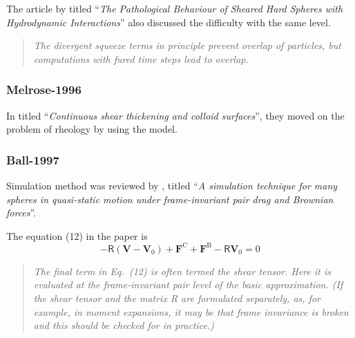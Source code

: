 \documentclass[12pt]{article}
\newcommand{\tens}[1]{\bm{\mathsf{#1}}}
\begin{document}
The article by \citet{Melrose_1995}
titled ``\emph{The Pathological Behaviour of Sheared Hard Spheres with Hydrodynamic Interactions}'' also discussed the difficulty with the same level.

\begin{quote}
\emph{The divergent squeeze terms in principle prevent overlap of particles,
 but computations with fured time steps lead to overlap. }
\end{quote}

\subsubsection*{Melrose-1996}

In \citet{Melrose_1996}
titled ``\emph{Continuous shear thickening and colloid surfaces}'',
they moved on the problem of rheology 
by using the model.  



\subsubsection*{Ball-1997}

Simulation method was reviewed  
by \citet{Ball_1997},
titled 
``\emph{A simulation technique for many spheres 
in quasi-static motion under frame-invariant pair drag and Brownian forces}''.

The equation (12) in the paper is 
\begin{equation}
 - \tens{R} (\bm{V}-\bm{V}_0)
 + \bm{F}^{\mathrm{C}}
 + \bm{F}^{\mathrm{B}}
 - \tens{R} \bm{V}_0 = 0
\end{equation}

\begin{quotation}
\emph{
 The final term in Eq.~(12) is often termed the shear tensor. 
Here it is evaluated at the frame-invariant pair level of the basic approximation. 
(If the shear tensor and the matrix R are formulated separately,
 as, for example, in moment expansions, 
it may be that frame invariance is broken and this should be checked for in practice.)
}
\end{quotation}
\end{document}
